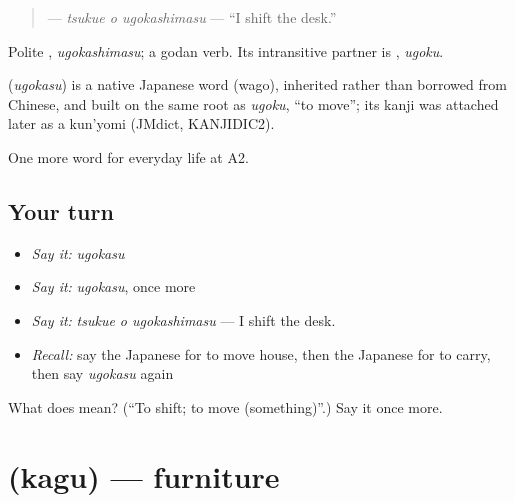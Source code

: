 \begin{quote}
\textbf{ } — \emph{tsukue o ugokashimasu} — \textquotedblleft{}I shift the desk.\textquotedblright{}
\end{quote}

Polite \textbf{}, \emph{ugokashimasu}; a godan verb. Its intransitive partner is \textbf{}, \emph{ugoku}.

\begin{cousinweb}
\textbf{} (\emph{ugokasu}) is a native Japanese word (wago), inherited rather than borrowed from Chinese, and built on the same root as \emph{ugoku}, \textquotedblleft{}to move\textquotedblright{}; its kanji was attached later as a kun'yomi (JMdict, KANJIDIC2).
\end{cousinweb}

\begin{grammarlens}[title={What you've built}]
One more word for everyday life at A2.
\end{grammarlens}

\subsection*{Your turn}
\begin{itemize}
\raggedright
  \item \emph{Say it:} \emph{ugokasu}
  \item \emph{Say it:} \emph{ugokasu}, once more
  \item \emph{Say it:} \emph{tsukue o ugokashimasu} — I shift the desk.
  \item \emph{Recall:} say the Japanese for to move house, then the Japanese for to carry, then say \emph{ugokasu} again
\end{itemize}

\begin{tcolorbox}[breakable,colback=teal!4,colframe=teal!35!black,title={Before you move on}]
What does  mean? (\textquotedblleft{}To shift; to move (something)\textquotedblright{}.) Say it once more.
\end{tcolorbox}
\section[\texorpdfstring{\ja{かぐ} (kagu)}{かぐ (kagu)}]{ (kagu) — furniture}

\label{lesson:JA-C155-kagu}



